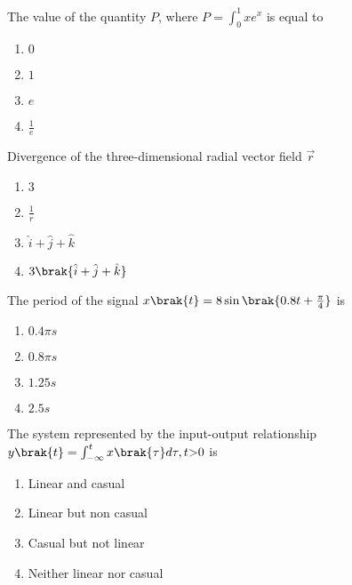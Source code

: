 \iffalse
	\title{2010-EE-1-13}
	\author{EE24Btech11006 - Arnav Mahishi}
	\section{ee}
	\chapter{2010}
\fi
\item{
The value of the quantity $P$, where $P=\int_0^1xe^x$ is equal to
\begin{multicols}{4}
\begin{enumerate}
\item $0$
\item $1$
\item $e$ 
\item $\frac{1}{e}$
\end{enumerate}
\end{multicols}
}
\item{
Divergence of the three-dimensional radial vector field $\overrightarrow{r}$
\begin{multicols}{4}
\begin{enumerate}
\item $3$
\item $\frac{1}{r}$
\item $\hat{i}+\hat{j}+\hat{k}$
\item $3\brak{\hat{i}+\hat{j}+\hat{k}}$
\end{enumerate}
\end{multicols}}
\item{
The period of the signal $x\brak{t}=8\sin\brak{0.8t+\frac{\pi}{4}}$ is
\begin{multicols}{4}
\begin{enumerate}
\item $0.4\pi s$
\item $0.8\pi s$
\item $1.25s$
\item $2.5s$
\end{enumerate}
\end{multicols}
}
\item{
The system represented by the input-output relationship $y\brak{t}=\int_{-\infty}^t x\brak{\tau}d\tau,t\text{\textgreater}0$ is
\begin{multicols}{2}
\begin{enumerate}
\item Linear and casual 
\item Linear but non casual 
\item Casual but not linear
\item Neither linear nor casual
\end{enumerate}
\end{multicols}
}
